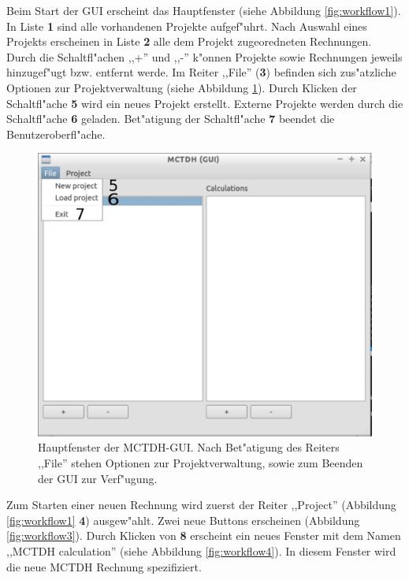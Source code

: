 Beim Start der GUI erscheint das Hauptfenster (siehe Abbildung \ref{fig:workflow1}).
In Liste \textbf{1} sind alle vorhandenen Projekte aufgef"uhrt.
Nach Auswahl eines Projekts erscheinen in Liste \textbf{2} alle dem Projekt zugeoredneten Rechnungen.
Durch die Schaltfl"achen ,,+'' und ,,-'' k"onnen Projekte sowie Rechnungen jeweils hinzugef"ugt bzw.
entfernt werde.
Im Reiter ,,File'' (\textbf{3}) befinden sich zus"atzliche Optionen zur Projektverwaltung (siehe Abbildung \ref{fig:workflow2}).
Durch Klicken der Schaltfl"ache \textbf{5} wird ein neues Projekt erstellt. Externe Projekte werden durch die 
Schaltfl"ache \textbf{6} geladen. Bet"atigung der Schaltfl"ache \textbf{7} beendet die Benutzeroberfl"ache.

\begin{figure}
    \centering
    \includegraphics[scale=0.5]{figures/screenMainFile}
    \caption{Hauptfenster der MCTDH-GUI. Nach Bet"atigung des Reiters ,,File''
		stehen Optionen zur Projektverwaltung, sowie zum Beenden der GUI zur Verf"ugung.}\label{fig:workflow2}
\end{figure}

Zum Starten einer neuen Rechnung wird zuerst der Reiter ,,Project'' (Abbildung \ref{fig:workflow1} \textbf{4}) 
ausgew"ahlt. Zwei neue Buttons erscheinen (Abbildung \ref{fig:workflow3}). Durch Klicken von \textbf{8} 
erscheint ein neues Fenster mit dem Namen ,,MCTDH calculation'' (siehe Abbildung \ref{fig:workflow4}). 
In diesem Fenster wird die neue MCTDH Rechnung spezifiziert.

